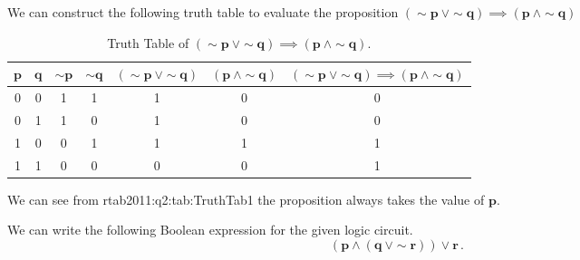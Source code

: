 %
%

\begin{subquestions}


\subquestion

We can construct the following truth table to evaluate the proposition $\boldsymbol{(\sim p ~\lor \sim q) \implies (p ~\land \sim q)}$
\begin{table}[ht]
	\centering
	\begin{tabular}{|c|c|c|c|c|c|c|}
		\hline
			$\boldsymbol{p}$ & $\boldsymbol{q}$ & $\boldsymbol{\sim p}$ & $\boldsymbol{\sim q}$ & $\boldsymbol{(\sim p \ \lor \sim q)}$ & $\boldsymbol{(p \ \land \sim q)}$ & $\boldsymbol{(\sim p \ \lor \sim  q) \implies (p \ \land \sim q)}$ \\
		\hline
		0 & 0 & 1 & 1 & 1 & 0 & 0 \\
		0 & 1 & 1 & 0 & 1 & 0 & 0 \\
		1 & 0 & 0 & 1 & 1 & 1 & 1 \\
		1 & 1 & 0 & 0 & 0 & 0 & 1 \\
		\hline
	\end{tabular}
	\caption{\label{2011:q2:tab:TruthTab1} Truth Table of $\boldsymbol{(\sim p ~\lor \sim q) \implies (p ~\land \sim q)}$.}
\end{table}

We can see from rtab{2011:q2:tab:TruthTab1} the proposition always takes the value of $\boldsymbol{p}$.

\subquestion

We can write the following Boolean expression for the given logic circuit.
\begin{equation}
	\boldsymbol{(p \land (q ~\lor \sim r)) \lor r}\,.
\end{equation}


\end{subquestions}
